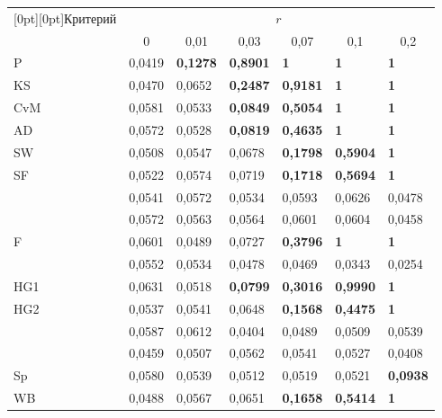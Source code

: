 \begin{multicols}{2}
\begin{table*}
\begin{center}
\begin{tabular}{|l|l|l|l|l|l|l|}
\hline
\multicolumn{1}{|c|}{\raisebox{-6pt}[0pt][0pt]{Критерий}}& \multicolumn{6}{c|}{$r$}\\
\cline{2-7}
&\multicolumn{1}{c|}{0}&\multicolumn{1}{c|}{0,01}&
\multicolumn{1}{c|}{0,03}&\multicolumn{1}{c|}{0,07}&\multicolumn{1}{c|}{0,1}&\multicolumn{1}{c|}{0,2}\\
\hline
\hspace*{4mm}P&0,0419&{\bf 0,1278}&{\bf 0,8901}&{\bf 1}&{\bf 1}&{\bf 1}\\
\hspace*{4mm}KS&0,0470&0,0652&{\bf 0,2487}&{\bf 0,9181}&{\bf 1}&{\bf 1}\\
\hspace*{4mm}CvM&0,0581&0,0533&{\bf 0,0849}&{\bf 0,5054}&{\bf 1}&{\bf 1}\\
\hspace*{4mm}AD&0,0572&0,0528&{\bf 0,0819}&{\bf 0,4635}&{\bf 1}&{\bf 1}\\
\hspace*{4mm}SW&0,0508&0,0547&0,0678&{\bf 0,1798}&{\bf 0,5904}&{\bf 1}\\
\hspace*{4mm}SF&0,0522&0,0574&0,0719&{\bf 0,1718}&{\bf 0,5694}&{\bf 1}\\
\hspace*{4mm}{\bf JB}&0,0541&0,0572&0,0534&0,0593&0,0626&0,0478\\
\hspace*{4mm}{\bf AJB}&0,0572&0,0563&0,0564&0,0601&0,0604&0,0458\\
\hspace*{4mm}F&0,0601&0,0489&0,0727&{\bf 0,3796}&{\bf 1}&{\bf 1}\\
\hspace*{4mm}{\bf G}&0,0552&0,0534&0,0478&0,0469&0,0343&0,0254\\
\hspace*{4mm}HG1&0,0631&0,0518&{\bf 0,0799}&{\bf 0,3016}&{\bf 0,9990}&{\bf 1}\\
\hspace*{4mm}HG2&0,0537&0,0541&0,0648&{\bf 0,1568}&{\bf 0,4475}&{\bf 1}\\
\hspace*{4mm}{\bf K}&0,0587&0,0612&0,0404&0,0489&0,0509&0,0539\\
\hspace*{4mm}{\bf S}&0,0459&0,0507&0,0562&0,0541&0,0527&0,0408\\
\hspace*{4mm}Sp&0,0580&0,0539&0,0512&0,0519&0,0521&{\bf 0,0938}\\
\hspace*{4mm}WB&0,0488&0,0567&0,0651&{\bf 0,1658}&{\bf 0,5414}&{\bf 1}\\
\hline
\end{tabular}
\end{center}
\end{table*}




\end{multicols}
